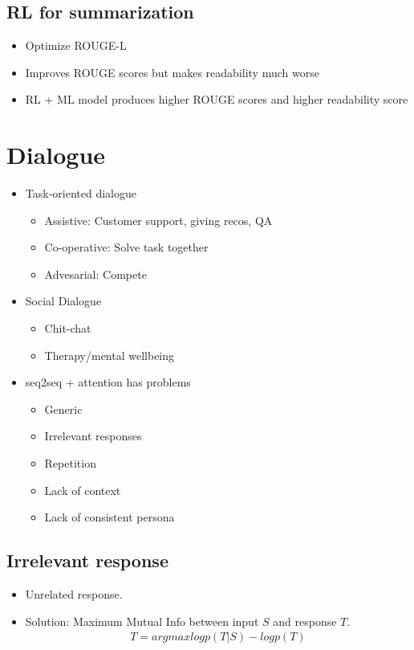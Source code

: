 \documentclass[a4paper]{article}
\begin{document}
\subsection{RL for summarization}
\begin{itemize}
    \item Optimize ROUGE-L
    \item Improves ROUGE scores but makes readability much worse
    \item RL + ML model produces higher ROUGE scores and higher readability score
\end{itemize}
\section{Dialogue}
\begin{itemize}
    \item Task-oriented dialogue
    \begin{itemize}
        \item Assistive: Customer support, giving recos, QA
        \item Co-operative: Solve task together
        \item Advesarial: Compete
    \end{itemize}
    \item Social Dialogue
    \begin{itemize}
        \item Chit-chat
        \item Therapy/mental wellbeing
    \end{itemize}
    \item seq2seq + attention has problems
    \begin{itemize}
        \item Generic
        \item Irrelevant responses
        \item Repetition
        \item Lack of context
        \item Lack of consistent persona
    \end{itemize}
\end{itemize}
\subsection{Irrelevant response}
\begin{itemize}
    \item Unrelated response. 
    \item Solution: Maximum Mutual Info between input $S$ and response $T$.
    \begin{equation}
    \begin{split}
        T = arg max{log p(T|S) - log p(T)}
    \end{split}
    \end{equation}
\end{itemize}
\end{document}
